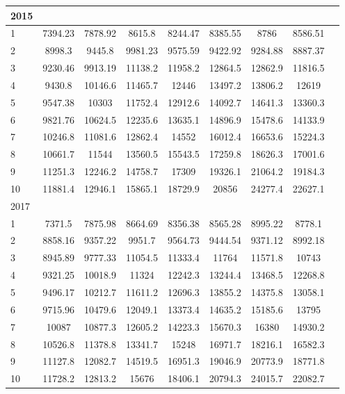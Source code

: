 \documentclass[jimaging,article,submit,pdftex,moreauthors]{Definitions/mdpi}
\begin{document}
\begin{longtable}{@{\extracolsep{\fill}}p{1.5cm}cccccccc@{}}
2015 &  &  &  &  &  &  & \\
\hline
1 & 7394.23 & 7878.92 & 8615.8 & 8244.47 & 8385.55 & 8786 & 8586.51 \\
2 & 8998.3 & 9445.8 & 9981.23 & 9575.59 & 9422.92 & 9284.88 & 8887.37 \\
3 & 9230.46 & 9913.19 & 11138.2 & 11958.2 & 12864.5 & 12862.9 & 11816.5 \\
4 & 9430.8 & 10146.6 & 11465.7 & 12446 & 13497.2 & 13806.2 & 12619 \\
5 & 9547.38 & 10303 & 11752.4 & 12912.6 & 14092.7 & 14641.3 & 13360.3 \\
6 & 9821.76 & 10624.5 & 12235.6 & 13635.1 & 14896.9 & 15478.6 & 14133.9 \\
7 & 10246.8 & 11081.6 & 12862.4 & 14552 & 16012.4 & 16653.6 & 15224.3 \\
8 & 10661.7 & 11544 & 13560.5 & 15543.5 & 17259.8 & 18626.3 & 17001.6 \\
9 & 11251.3 & 12246.2 & 14758.7 & 17309 & 19326.1 & 21064.2 & 19184.3 \\
10 & 11881.4 & 12946.1 & 15865.1 & 18729.9 & 20856 & 24277.4 & 22627.1 \\
\hline
2017 &  &  &  & & & & \\
\hline
1 & 7371.5 & 7875.98 & 8664.69 & 8356.38 & 8565.28 & 8995.22 & 8778.1 \\
2 & 8858.16 & 9357.22 & 9951.7 & 9564.73 & 9444.54 & 9371.12 & 8992.18 \\
3 & 8945.89 & 9777.33 & 11054.5 & 11333.4 & 11764 & 11571.8 & 10743 \\
4 & 9321.25 & 10018.9 & 11324 & 12242.3 & 13244.4 & 13468.5 & 12268.8 \\
5 & 9496.17 & 10212.7 & 11611.2 & 12696.3 & 13855.2 & 14375.8 & 13058.1 \\
6 & 9715.96 & 10479.6 & 12049.1 & 13373.4 & 14635.2 & 15185.6 & 13795 \\
7 & 10087 & 10877.3 & 12605.2 & 14223.3 & 15670.3 & 16380 & 14930.2 \\
8 & 10526.8 & 11378.8 & 13341.7 & 15248 & 16971.7 & 18216.1 & 16582.3 \\
9 & 11127.8 & 12082.7 & 14519.5 & 16951.3 & 19046.9 & 20773.9 & 18771.8 \\
10 & 11728.2 & 12813.2 & 15676 & 18406.1 & 20794.3 & 24015.7 & 22082.7 \\
\hline


\end{longtable}
\end{document}
